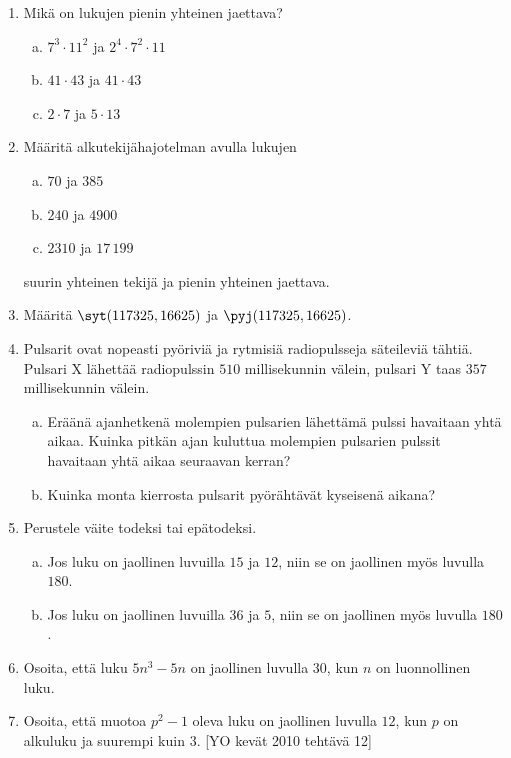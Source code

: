 \begin{enumerate}
\item Mikä on lukujen pienin yhteinen jaettava?
\begin{enumerate}[a)]
\item $7^3 \cdot 11^2$ ja $2^4 \cdot 7^2 \cdot 11$
\item $41 \cdot 43$ ja $41 \cdot 43$
\item $2 \cdot 7$ ja $5 \cdot 13$
\end{enumerate}

\item Määritä alkutekijähajotelman avulla lukujen
\begin{enumerate}[a)]
\item $70$ ja $385$
\item $240$ ja $4900$
\item $2310$ ja $17\, 199$
\end{enumerate}
suurin yhteinen tekijä ja pienin yhteinen jaettava.

\item
Määritä $\syt(117325, 16625)$ ja $\pyj(117325, 16625)$.

\item Pulsarit ovat nopeasti pyöriviä ja rytmisiä radiopulsseja
säteileviä tähtiä. Pulsari X lähettää radiopulssin $510$
millisekunnin välein, pulsari Y taas $357$ millisekunnin välein.

\begin{enumerate}[a)]
\item Eräänä ajanhetkenä molempien pulsarien lähettämä pulssi
havaitaan yhtä aikaa. Kuinka pitkän ajan kuluttua molempien
pulsarien pulssit havaitaan yhtä aikaa seuraavan kerran?
\item Kuinka monta kierrosta pulsarit pyörähtävät kyseisenä
aikana?
\end{enumerate}

\item Perustele väite todeksi tai epätodeksi.
\begin{enumerate}[a)]
\item Jos luku on jaollinen luvuilla $15$ ja $12$, niin se on
jaollinen myös luvulla $180$.
\item Jos luku on jaollinen luvuilla $36$ ja $5$, niin se on
jaollinen myös luvulla $180$.
\end{enumerate}

\item
Osoita, että luku $5n^3 - 5n$ on jaollinen luvulla $30$, kun $n$
on luonnollinen luku.

\item Osoita, että muotoa $p^2 - 1$ oleva luku on jaollinen
luvulla $12$, kun $p$ on alkuluku ja suurempi kuin $3$. [YO kevät 2010
tehtävä 12]


\end{enumerate}
